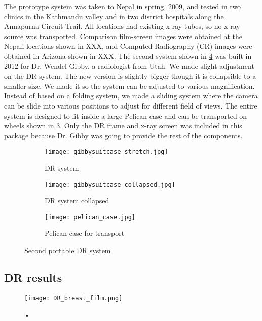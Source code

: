 The prototype system was taken to Nepal in spring, 2009, and tested in two clinics in the Kathmandu valley and in two district hospitals along the Annapurna Circuit Trail.  All locations had existing x-ray tubes, so no x-ray source was transported. Comparison film-screen images were obtained at the Nepali locations shown in XXX, and Computed Radiography (CR) images were obtained in Arizona shown in XXX.
The second system shown in \ref{fig:DR2} was built in 2012 for Dr. Wendel Gibby, a radiologist from Utah.  We made slight adjustment on the DR system.  The new version is slightly bigger though it is collapsible to a smaller size.  We made it so the system can be adjusted to various magnification.  Instead of based on a folding system, we made a sliding system where the camera can be slide into various positions to adjust for different field of views.  The entire system is designed to fit inside a large Pelican case and can be transported on wheels shown in \ref{fig:pelicancase}.  Only the DR frame and x-ray screen was included in this package because Dr. Gibby was going to provide the rest of the components.  

\begin{figure}
	\begin{subfigure}[b]{0.3\linewidth}
	\centering
	\texttt{[image: gibbysuitcase\_stretch.jpg]}
	\caption{DR system}
	\label{DR2stretched}
	\end{subfigure}
\hspace{0.2cm}
	\begin{subfigure}[b]{0.3\linewidth}
	\centering
	\texttt{[image: gibbysuitcase\_collapsed.jpg]}
	\caption{DR system collapsed}
	\label{fig:DR2collapsed}
	\end{subfigure}
\hspace{0.2cm}	
	\begin{subfigure}[b]{0.3\linewidth}
	\centering
	\texttt{[image: pelican\_case.jpg]}
	\caption{Pelican case for transport}
	\label{fig:pelicancase}
	\end{subfigure}
\caption{Second portable DR system}
\label{fig:DR2}	
\end{figure}

\subsection{DR results}

\begin{figure}
\texttt{[image: DR\_breast\_film.png]}
\caption{•}
\label{fig:DR_breast_film}
\end{figure}

